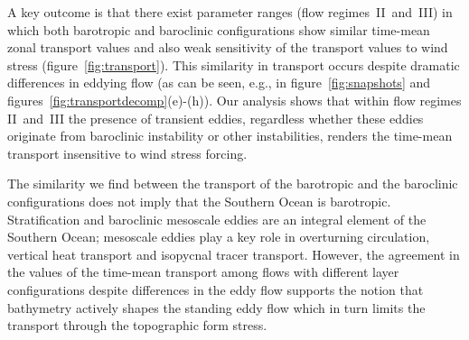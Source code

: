 \documentclass{agujournal2019}
\begin{document}
A key outcome is that there exist parameter ranges (flow regimes~II~and~III) in which both barotropic and baroclinic configurations show similar time-mean zonal  transport values and also {\color{black}weak sensitivity} of the transport values to wind stress (figure~\ref{fig:transport}). This similarity in transport occurs despite dramatic differences in eddying flow (as can be seen, e.g., in figure~\ref{fig:snapshots} and figures~\ref{fig:transportdecomp}(e)-(h)). Our analysis shows that within flow regimes II~and~III the presence of transient eddies, regardless whether these eddies originate from baroclinic instability or other instabilities, renders the time-mean transport insensitive to wind stress forcing. 


The similarity we find between the transport of the barotropic and the baroclinic configurations does not imply that the Southern Ocean is barotropic. Stratification and baroclinic mesoscale eddies are an integral element of the Southern Ocean; mesoscale eddies play a key role in overturning circulation, vertical heat transport and isopycnal tracer transport. However, the agreement in the values of the time-mean transport {\color{black}among flows with different layer configurations} despite differences in the eddy flow supports the notion that bathymetry actively shapes the standing eddy flow which in turn {\color{black}limits} the transport through the topographic form stress.
\end{document}
